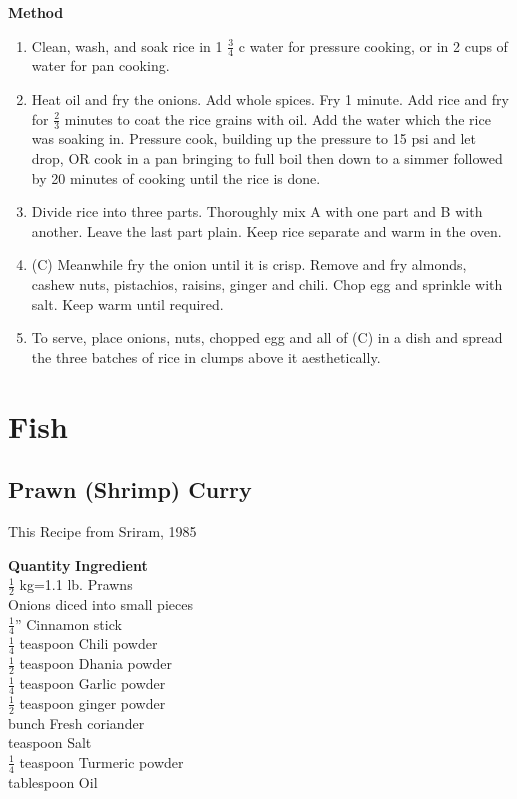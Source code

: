 {\bf Method}
\begin{enumerate}
\item Clean, wash, and soak rice in 1 $\frac{3}{4}$ c water for pressure cooking, or in
2 cups of water for pan cooking.
\item Heat oil and fry the onions. Add whole spices.  Fry 1 minute.  Add rice and
fry for $\frac{2}{3}$ minutes to coat the rice grains with oil. Add the water which the
rice was soaking in.  Pressure cook, building up the pressure to 15 psi and
let drop, OR cook in a pan bringing to full boil then down to a simmer followed by
20 minutes of cooking until the rice is done.
\item Divide rice into three parts. Thoroughly mix A with one part and B with
another.  Leave the last part plain.  Keep rice separate and warm in the oven.
\item (C)  Meanwhile fry the onion until it is crisp.  Remove and fry almonds,
cashew nuts, pistachios, raisins, ginger and chili.  Chop egg and sprinkle with
salt.  Keep warm until required.
\item To serve, place onions, nuts, chopped egg and all of (C) in a dish
and spread the three batches of rice in clumps above it aesthetically.
\end{enumerate}


\chapter{Fish}

\section{Prawn (Shrimp) Curry}
  This Recipe from Sriram, 1985

\begin{tabbing}
\hspace{1.0cm}  \={\bf Quantity}   \hspace{3.0cm} \={\bf Ingredient}\\

 \>$\frac{1}{2}$ kg=1.1 lb.    \>Prawns\\
     \>Onions diced into small pieces\\
 \>$\frac{1}{4}$''   \>Cinnamon stick\\
 \>$\frac{1}{4}$ teaspoon   \>Chili powder\\
 \>$\frac{1}{2}$ teaspoon   \>Dhania powder\\
 \>$\frac{1}{4}$ teaspoon   \>Garlic powder\\
 \>$\frac{1}{2}$ teaspoon   \>ginger powder\\
  bunch   \>Fresh coriander\\
  teaspoon   \>Salt\\
 \>$\frac{1}{4}$ teaspoon   \>Turmeric powder\\
  tablespoon   \>Oil\\
\end{tabbing}

